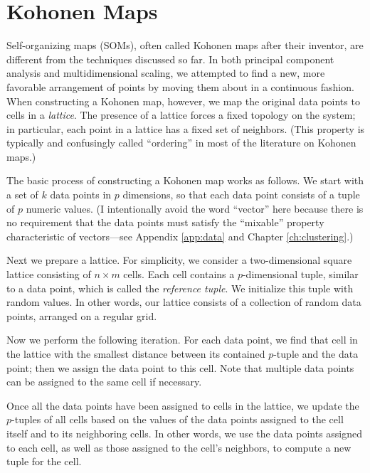 \section{Kohonen Maps}


Self-organizing maps (SOMs), often called Kohonen maps after their
inventor, are different from the techniques discussed so far. In both
principal component analysis and multidimensional scaling, we
attempted\vadjust{\pagebreak} to find a new, more favorable
arrangement of points by moving them about in a continuous fashion.
When constructing a Kohonen map, however, we map the original data
points to cells in a \emph{lattice}. The presence of a lattice forces a
fixed topology on the system; in particular, each point in a lattice
has a fixed set of neighbors. (This property is typically and
confusingly called ``ordering'' in most of the literature on Kohonen
maps.)

The basic process of constructing a Kohonen map works as follows. We
start with a set of $k$ data points in $p$ dimensions, so that each
data point consists of a tuple of $p$ numeric values.  (I
intentionally avoid the word ``vector'' here because there is no
requirement that the data points must satisfy the ``mixable'' property
characteristic of vectors---see Appendix \ref{app:data} and Chapter
\ref{ch:clustering}.)

Next we prepare a lattice. For simplicity, we consider a
two-dimensional square lattice consisting of $n \times m$ cells.  Each
cell contains a $p$-dimensional tuple, similar to a data point, which
is called the \emph{reference tuple}. We initialize this tuple with
random values. In other words, our lattice consists of a collection of
random data points, arranged on a regular grid.

Now we perform the following iteration. For each data point, we find
that cell in the lattice with the smallest distance between its
contained $p$-tuple and the data point; then we assign the data point
to this cell. Note that multiple data points can be assigned to the
same cell if necessary.

Once all the data points have been assigned to cells in the lattice,
we update the $p$-tuples of all cells based on the values of the data
points assigned to the cell itself and to its neighboring cells. In
other words, we use the data points assigned to each cell, as well as
those assigned to the cell's neighbors, to compute a new tuple for the
cell.

